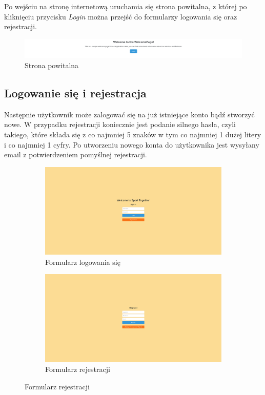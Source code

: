\documentclass[11pt,a4paper]{article}
\begin{document}
Po wejściu na stronę internetową uruchamia się strona powitalna, z której po kliknięciu przycisku \textit{Login} można przejść do formularzy logowania się oraz rejestracji. 

\begin{figure} [H]
    \centering
    \includegraphics[width=1\linewidth]{pages/welcome.png}
    \caption{Strona powitalna}
\end{figure}

\subsection{Logowanie się i rejestracja}

Następnie użytkownik może zalogować się na już istniejące konto bądź stworzyć nowe. W przypadku rejestracji koniecznie jest podanie silnego hasła, czyli takiego, które składa się z co najmniej 5 znaków w tym co najmniej 1 dużej litery i co najmniej 1 cyfry. Po utworzeniu nowego konta do użytkownika jest wysyłany email z potwierdzeniem pomyślnej rejestracji.

\begin{figure}[H]
    \centering
    \captionsetup{justification=centering,margin=2cm}
        \begin{subfigure}{0.49\textwidth}
            \includegraphics[width=\textwidth]{pages/login_page.png}
            \caption{Formularz logowania się}
        \end{subfigure}
    \hfill
        \begin{subfigure}{0.49\textwidth}
            \includegraphics[width=\textwidth]{pages/register.png}
            \caption{Formularz rejestracji}
        \end{subfigure}
\end{figure}
\end{document}
